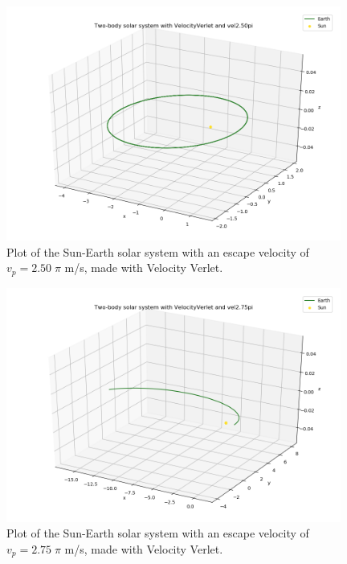 \documentclass{article}
\begin{document}
    \begin{figure}[H]
        \centering
        \includegraphics[width = 11cm]{img/plot3D_S_E_V_vel250pi.png}
        \caption{Plot of the Sun-Earth solar system with an escape velocity of $v_p = 2.50 \; \pi$ m/s, made with Velocity Verlet. }
        \label{fig:plot3D_S_E_V_vel250pi}
    \end{figure}

    \begin{figure}[H]
        \centering
        \includegraphics[width = 11cm]{img/plot3D_S_E_V_vel275pi.png}
        \caption{Plot of the Sun-Earth solar system with an escape velocity of $v_p = 2.75 \; \pi$ m/s, made with Velocity Verlet. }
        \label{fig:plot3D_S_E_V_vel275pi}
    \end{figure}
\end{document}
